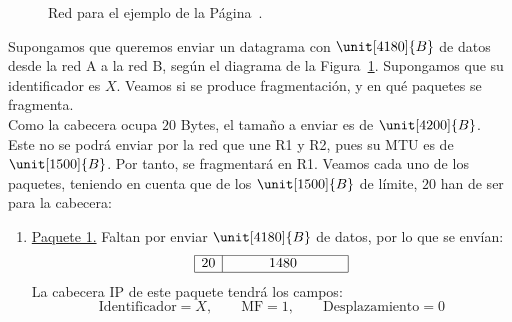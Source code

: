 \begin{ejemplo}\label{ejemplo:fragmentacion}
    \begin{figure}
        \centering
        \caption{Red para el ejemplo de la Página~\pageref{ejemplo:fragmentacion}.}
        \label{fig:fragmentacion}
    \end{figure}

    Supongamos que queremos enviar un datagrama con $\unit[4180]{B}$ de datos desde la red A a la red B, según el diagrama de la Figura~\ref{fig:fragmentacion}. Supongamos que su identificador es $X$. Veamos si se produce fragmentación, y en qué paquetes se fragmenta.\\

    Como la cabecera ocupa $20$ Bytes, el tamaño a enviar es de $\unit[4200]{B}$. Este no se podrá enviar por la red que une R1 y R2, pues su \acrshort{MTU} es de $\unit[1500]{B}$. Por tanto, se fragmentará en R1. Veamos cada uno de los paquetes, teniendo en cuenta que de los $\unit[1500]{B}$ de límite, $20$ han de ser para la cabecera:
    \begin{enumerate}
        \item \ul{Paquete 1.} Faltan por enviar $\unit[4180]{B}$ de datos, por lo que se envían:
        \begin{equation*}
            \begin{array}{|c|c|}
                \hline 20 & \hspace{1cm} 1480 \hspace{1cm}~\\ \hline
            \end{array}
        \end{equation*}
        La cabecera IP de este paquete tendrá los campos:
        \begin{equation*}
            \text{Identificador} = X,\qquad \text{MF} = 1,\qquad \text{Desplazamiento} = 0
        \end{equation*}


\end{enumerate}
\end{ejemplo}
